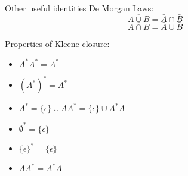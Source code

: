 \documentclass[style=sailor,size=12pt]{powerdot}
\begin{document}
\begin{slide}[bm=,toc=]{Other useful identities}
De Morgan Laws:
\[
\overline{A \cup B} = \bar{A} \cap \bar{B}  
\]
\[
\overline{A \cap B} = \bar{A} \cup \bar{B}  
\]

Properties of Kleene closure:
\begin{itemize}
\item $A^*A^* = A^*$
\item $(A^*)^* = A^*$
\item $A^* = \{\epsilon\} \cup AA^* = \{\epsilon\}\cup A^*A $
\item $\emptyset^* = \{\epsilon\}$ 
\item $\{\epsilon\}^* = \{\epsilon\}$ 
\item $AA^* = A^*A$ 
\end{itemize}
\end{slide}
\end{document}
